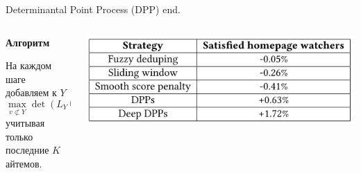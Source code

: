 \documentclass[11pt,aspectratio=169,handout]{beamer}
\begin{document}
\begin{frame}{Determinantal Point Process (DPP) end.}

\begin{columns}

\begin{column}{0.45\textwidth}
{\bf Алгоритм}

На каждом шаге добавляем к $Y$ 
\[
\max_{v \not \subset Y} \det(L_Y \cup v),
\]
учитывая только последние $K$ айтемов.
\end{column}

\begin{column}{0.45\textwidth} 
\begin{center}
\includegraphics[scale=0.3]{images/ddp-res.png}
\end{center}
\end{column}

\end{columns}

\end{frame}
\end{document}
